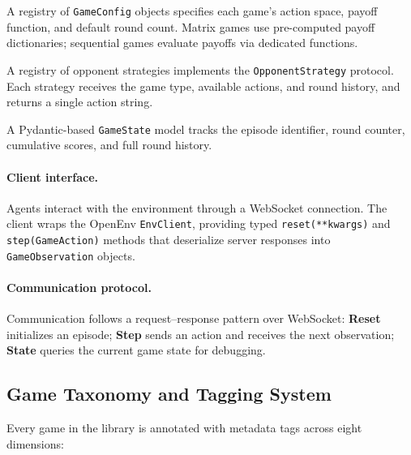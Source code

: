 \begin{description}[nosep]
    \item[Game Engine.] A registry of \texttt{GameConfig} objects
        specifies each game's action space, payoff function, and
        default round count. Matrix games use pre-computed payoff
        dictionaries; sequential games evaluate payoffs via dedicated
        functions.
    \item[Strategy Module.] A registry of opponent strategies
        implements the \texttt{OpponentStrategy} protocol. Each
        strategy receives the game type, available actions, and round
        history, and returns a single action string.
    \item[State Manager.] A Pydantic-based \texttt{GameState} model
        tracks the episode identifier, round counter, cumulative
        scores, and full round history.
\end{description}

\paragraph{Client interface.}
Agents interact with the environment through a WebSocket connection.
The client wraps the OpenEnv \texttt{EnvClient}, providing typed
\texttt{reset(**kwargs)} and \texttt{step(GameAction)} methods that
deserialize server responses into \texttt{GameObservation} objects.

\paragraph{Communication protocol.}
Communication follows a request--response pattern over WebSocket:
\textbf{Reset} initializes an episode; \textbf{Step} sends an action
and receives the next observation; \textbf{State} queries the current
game state for debugging.

\subsection{Game Taxonomy and Tagging System}
\label{sec:taxonomy}

Every game in the library is annotated with metadata tags across eight
dimensions:

